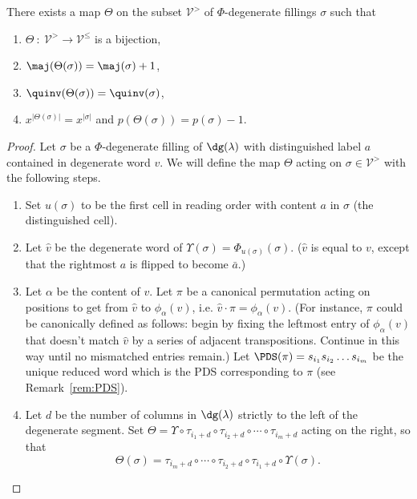 \begin{proposition}\label{thm:Wbijection}
There exists a map $\Theta$ on the subset $\mathcal{V}^{>}$ of $\Phi$-degenerate fillings $\sigma$ such that
\begin{enumerate}[label=(\arabic*)]
\item \label{it2vvt1}$\Theta\ :\ \mathcal{V}^{>} \longrightarrow \mathcal{V}^{\leq}$ is a bijection,
\item \label{it2vvt2} $\maj(\Theta(\sigma)) = \maj(\sigma) +1$,
\item \label{it2vvt3} $\quinv(\Theta(\sigma))=\quinv(\sigma)$,
\item \label{it2vvt4} $x^{|\Theta(\sigma)|}=x^{|\sigma|}$ and $p(\Theta(\sigma))=p(\sigma)-1$.
\end{enumerate}
\end{proposition}
\begin{proof}
Let $\sigma$ be a $\Phi$-degenerate filling of $\dg(\lambda)$ with distinguished label $a$ contained in degenerate word $v$.  We will define the map $\Theta$ acting on $\sigma\in \mathcal{V}^{>}$ with the following steps.
\begin{enumerate}[label=(\roman*)]
\item\label{item:u} Set $u(\sigma)$ to be the first cell in reading order with content $a$ in $\sigma$ (the distinguished cell). 
\item Let $\widehat{v}$ be the degenerate word of $\Upsilon(\sigma)=\Phi_{u(\sigma)}(\sigma)$. ($\widehat{v}$ is equal to $v$, except that the rightmost $a$ is flipped to become $\bar{a}$.)
\item Let $\alpha$ be the content of $v$. 
Let $\pi$ be a canonical permutation acting on positions to get from $\widehat{v}$ to $\phi_{\alpha}(v)$, i.e. $\widehat{v}\cdot \pi=\phi_\alpha(v)$. (For instance, $\pi$ could be canonically defined as follows: begin by fixing the leftmost entry of $\phi_\alpha(v)$ that doesn't match $\widehat{v}$ by a series of adjacent transpositions. Continue in this way until no mismatched entries remain.) Let $\PDS(\pi)=s_{i_1}s_{i_2}\ldots s_{i_m}$ be the unique reduced word which is the PDS corresponding to $\pi$ (see Remark~\ref{rem:PDS}).
\item Let $d$ be the number of columns in $\dg(\lambda)$ strictly to the left of the degenerate segment. Set 
$\Theta = \Upsilon\circ \tau_{i_1+d}\circ \tau_{i_2+d} \circ\cdots \circ \tau_{i_m+d}$ acting on the right, so that
\[
\Theta(\sigma) = \tau_{i_m+d}\circ \cdots\circ\tau_{i_2+d}\circ \tau_{i_1+d}\circ\Upsilon(\sigma).
\]
\end{enumerate}


\end{proof}

